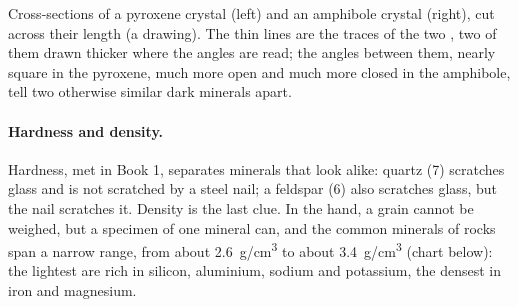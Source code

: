 \begin{omfigure}

{\small Cross-sections of a pyroxene crystal (left) and an amphibole crystal
(right), cut across their length (a drawing). The thin lines are the traces
of the two , two of them drawn thicker where the angles are read;
the angles between them, nearly square in the pyroxene, much more open and much more closed in the amphibole, tell two
otherwise similar dark minerals apart.}
\end{omfigure}

\paragraph{Hardness and density.} Hardness, met in Book 1, separates
minerals that look alike: quartz (7) scratches glass and is not scratched by
a steel nail; a feldspar (6) also scratches glass, but the nail scratches it.
Density is the last clue. In the hand, a grain cannot be weighed, but a
specimen of one mineral can, and the common minerals of rocks span a narrow
range, from about \qty{2.6}{g/cm^3} to about \qty{3.4}{g/cm^3} (chart below):
the lightest are rich in silicon, aluminium, sodium and potassium, the
densest in iron and magnesium.


